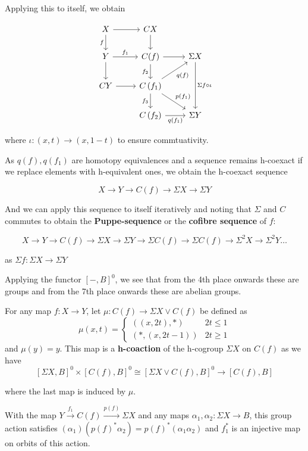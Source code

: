 \documentclass[12pt]{article}
\begin{document}
Applying this to itself, we obtain

\[\begin{tikzcd}
	X & CX \\
	Y & {C(f)} & {\Sigma X} \\
	CY & {C\left(f_1\right)} \\
	& {C\left(f_2\right)} & {\Sigma Y}
	\arrow["f"', from=1-1, to=2-1]
	\arrow[from=1-1, to=1-2]
	\arrow[from=1-2, to=2-2]
	\arrow[from=2-1, to=3-1]
	\arrow[from=3-1, to=3-2]
	\arrow["{f_3}"', from=3-2, to=4-2]
	\arrow["{q\left(f_1\right)}"', from=4-2, to=4-3]
	\arrow[from=2-2, to=2-3]
	\arrow["{f_2}"', from=2-2, to=3-2]
	\arrow["{f_1}", from=2-1, to=2-2]
	\arrow["{q(f)}"', from=3-2, to=2-3]
	\arrow["{p\left(f_1\right)}", from=3-2, to=4-3]
	\arrow["{\Sigma f\circ\iota}", from=2-3, to=4-3]
\end{tikzcd}\]

where $\iota:(x,t)\to(x,1-t)$ to ensure commtuativity.

As $q(f),q\left(f_1\right)$ are homotopy equivalences and a sequence remains h-coexact if we replace elements with h-equivalent ones, we obtain the h-coexact sequence

\[X\to Y\to C(f)\to\Sigma X\to\Sigma Y\]

And we can apply this sequence to itself iteratively and noting that $\Sigma$ and $C$ commutes to obtain the \textbf{Puppe-sequence} or the \textbf{cofibre sequence} of $f$:

\[X\to Y\to C(f)\to\Sigma X\to\Sigma Y\to\Sigma C(f)\to\Sigma C(f)\to\Sigma^2X\to\Sigma^2Y\dots\]

as $\Sigma f:\Sigma X\to\Sigma Y$

Applying the functor $\left[-,B\right]^0$, we see that from the 4th place onwards these are groups and from the 7th place onwards these are abelian groups.

For any map $f:X\to Y$, let $\mu:C(f)\to\Sigma X\vee C(f)$ be defined as 
\[\mu(x,t)=\begin{cases}\left((x,2t),*\right)&2t\leq 1\\\left(*,(x,2t-1)\right)&2t\geq 1\end{cases}\]
and $\mu(y)=y$. This map is a \textbf{h-coaction} of the h-cogroup $\Sigma X$ on $C(f)$ as we have
\[\left[\Sigma X,B\right]^0\times\left[C(f),B\right]^0\cong\left[\Sigma X\vee C(f),B\right]^0\to\left[C(f),B\right]\]

where the last map is induced by $\mu$. 

With the map $Y\overset{f_1}\to C(f)\overset{p(f)}\to\Sigma X$ and any maps $\alpha_1,\alpha_2:\Sigma X\to B$, this group action satisfies $\left(\alpha_1\right)\left(p(f)^*\alpha_2\right)=p(f)^*\left(\alpha_1\alpha_2\right)$ and $f_1^*$ is an injective map on orbits of this action.
\end{document}
